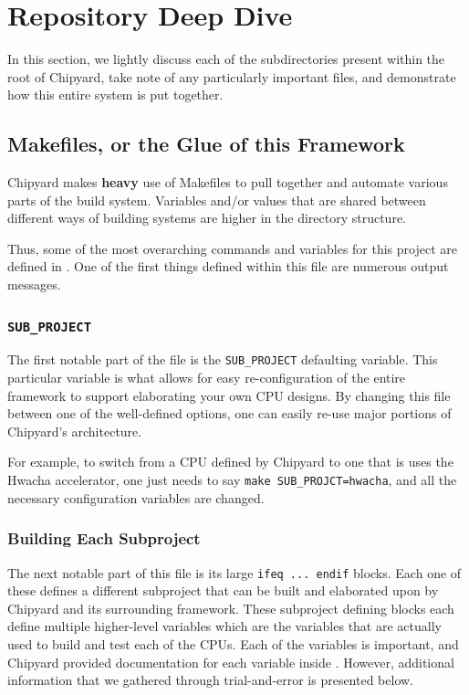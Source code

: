 \chapter{Repository Deep Dive}\label{chap:Repository_Deep_Dive}
In this section, we lightly discuss each of the subdirectories present within the root of Chipyard, take note of any particularly important files, and demonstrate how this entire system is put together.

\section{Makefiles, or the Glue of this Framework}\label{sec:Makefiles_in_Chipyard}
Chipyard makes \textbf{heavy} use of Makefiles to pull together and automate various parts of the build system.
Variables and/or values that are shared between different ways of building systems are higher in the directory structure.

Thus, some of the most overarching commands and variables for this project are defined in .
One of the first things defined within this file are numerous output messages.

\subsection{\texttt{SUB\_PROJECT}}\label{subsec:Makefile_SUB_PROJECT}
The first notable part of the  file is the \texttt{SUB\_PROJECT} defaulting variable.
This particular variable is what allows for easy re-configuration of the entire framework to support elaborating your own CPU designs.
By changing this file between one of the well-defined options, one can easily re-use major portions of Chipyard's architecture.

For example, to switch from a CPU defined by Chipyard to one that is uses the Hwacha accelerator, one just needs to say \texttt{make SUB_PROJCT=hwacha}, and all the necessary configuration variables are changed.

\subsection{Building Each Subproject}\label{subsec:Building_Each_Subproject}
The next notable part of this file is its large \texttt{ifeq ... endif} blocks.
Each one of these defines a different subproject that can be built and elaborated upon by Chipyard and its surrounding framework.
These subproject defining blocks each define multiple higher-level variables which are the variables that are actually used to build and test each of the CPUs.
Each of the variables is important, and Chipyard provided documentation for each variable inside .
However, additional information that we gathered through trial-and-error is presented below.

